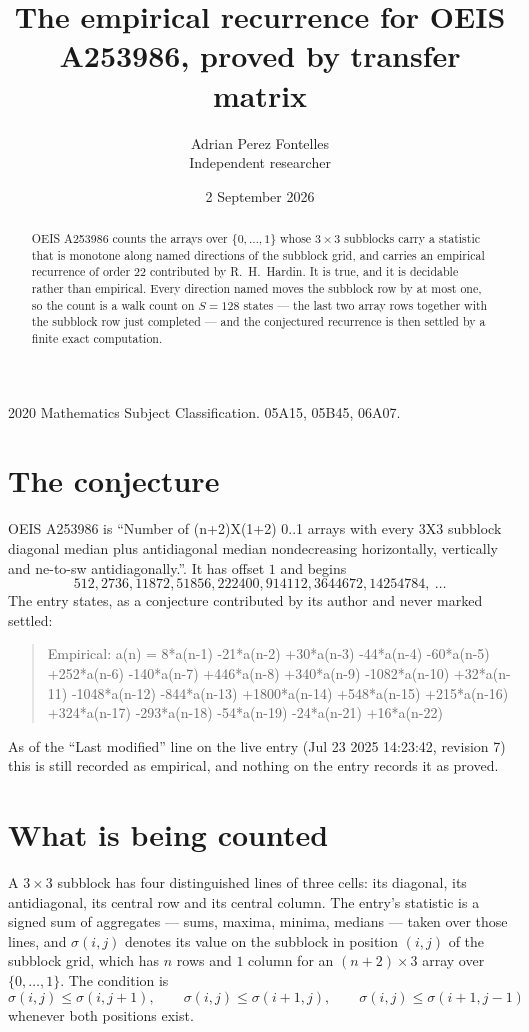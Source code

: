 \documentclass[11pt,a4paper]{article}
\title{The empirical recurrence for OEIS A253986, proved by transfer matrix}
\author{Adrian Perez Fontelles\\ \small Independent researcher}
\date{2 September 2026}
\theoremstyle{plain}
\theoremstyle{definition}
\begin{document}
\maketitle

\begin{abstract}
OEIS A253986 counts the arrays over $\{0,\dots,1\}$ whose $3\times3$ subblocks carry a
statistic that is monotone along named directions of the subblock grid, and carries an
empirical recurrence of order $22$ contributed by R.~H.~Hardin. It is true, and it is
decidable rather than empirical. Every direction named moves the subblock row by at most one,
so the count is a walk count on $S=128$ states --- the last two array rows together with the
subblock row just completed --- and the conjectured recurrence is then settled by a finite
exact computation.
\end{abstract}

\noindent\small 2020 Mathematics Subject Classification. 05A15, 05B45, 06A07.\normalsize

\section{The conjecture}

OEIS A253986 is ``Number of (n+2)X(1+2) 0..1 arrays with every 3X3 subblock diagonal median plus antidiagonal median nondecreasing horizontally, vertically and ne-to-sw antidiagonally.''. It has offset $1$ and begins
\[
512, 2736, 11872, 51856, 222400, 914112, 3644672, 14254784,\ \dots
\]
The entry states, as a conjecture contributed by its author and never marked settled:
\begin{quote}
Empirical: a(n) = 8*a(n-1) -21*a(n-2) +30*a(n-3) -44*a(n-4) -60*a(n-5) +252*a(n-6) -140*a(n-7) +446*a(n-8) +340*a(n-9) -1082*a(n-10) +32*a(n-11) -1048*a(n-12) -844*a(n-13) +1800*a(n-14) +548*a(n-15) +215*a(n-16) +324*a(n-17) -293*a(n-18) -54*a(n-19) -24*a(n-21) +16*a(n-22)
\end{quote}
As of the ``Last modified'' line on the live entry (Jul 23 2025 14:23:42, revision 7) this is still
recorded as empirical, and nothing on the entry records it as proved.

\section{What is being counted}

A $3\times3$ subblock has four distinguished lines of three cells: its diagonal, its
antidiagonal, its central row and its central column. The entry's statistic is a signed sum of
aggregates --- sums, maxima, minima, medians --- taken over those lines, and $\sigma(i,j)$
denotes its value on the subblock in position $(i,j)$ of the subblock grid, which has $n$ rows
and $1$ column for an $(n+2)\times3$ array over $\{0,\dots,1\}$. The condition is
\[
\sigma(i,j)\le\sigma(i,j+1),\qquad \sigma(i,j)\le\sigma(i+1,j),\qquad \sigma(i,j)\le\sigma(i+1,j-1)
\]
whenever both positions exist.
\end{document}

